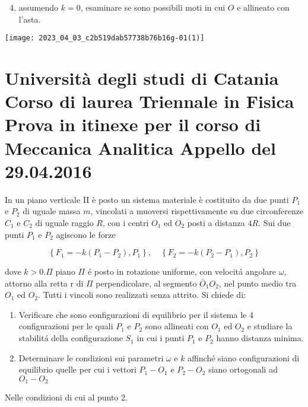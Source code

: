 \documentclass[10pt]{article}
\begin{document}
\begin{enumerate}
  \setcounter{enumi}{3}
  \item assumendo \(k=0\), esaminare se sono possibili moti in cui \(O\) e allineato con l'asta.
\end{enumerate}

\begin{center}
\texttt{[image: 2023\_04\_03\_c2b519dab57738b76b16g-01(1)]}
\end{center}

\section{Università degli studi di Catania
Corso di laurea Triennale in Fisica
Prova in itinexe per il corso di Meccanica Analitica
Appello del 29.04.2016}
In un piano verticale II è posto un sistema materiale è costituito da due punti \(P_{1}\) e \(P_{2}\) di uguale massa \(m\), vincolati a muoversi rispettivamente su due circonferenze \(C_{1}\) e \(C_{2}\) di uguale raggio \(R\), con i centri \(O_{1}\) ed \(O_{2}\) posti a distanza \(4 R\). Sui due punti \(P_{1}\) e \(P_{2}\) agiscono le forze

\[
\left\{F_{1}=-k\left(P_{1}-P_{2}\right), P_{1}\right\}, \quad\left\{F_{2}=-k\left(P_{2}-P_{1}\right), P_{2}\right\}
\]

dove \(k>0 . \Pi\) piano \(\Pi\) é posto in rotazione uniforme, con velocitá angolare \(\omega\), attorno alla retta \(\mathrm{r}\) di \(\Pi\) perpendicolare, al segmento \(\bar{O}_{1} O_{2}\), nel punto medio tra \(O_{1}\) ed \(O_{2}\). Tutti i vincoli sono realizzati senza attrito. Si chiede di:

\begin{enumerate}
  \item Verificare che sono configurazioni di equilibrio per il sistema le 4 configurazioni per le quali \(P_{1}\) e \(P_{2}\) sono allineati con \(O_{1}\) ed \(O_{2}\) e studiare la stabilitá della configurazione \(S_{1}\) in cui i punti \(P_{1}\) e \(P_{2}\) hanno distanza minima.

  \item Determinare le condizioni sui parametri \(\omega\) e \(k\) affinché siano configurazioni di equilibrio quelle per cui i vettori \(P_{1}-O_{1}\) e \(P_{2}-O_{2}\) siano ortogonali ad \(O_{1}-O_{2}\)

\end{enumerate}

Nelle condizioni di cui al punto 2.
\end{document}
